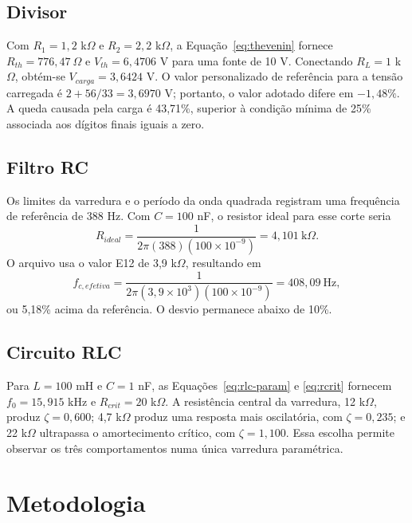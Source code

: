 \documentclass[10pt,journal,onecolumn,a4paper]{IEEEtran}
\begin{document}
\subsection{Divisor}

Com $R_1=1{,}2$ k$\Omega$ e $R_2=2{,}2$ k$\Omega$, a Equação~\eqref{eq:thevenin} fornece
$R_{th}=776{,}47\ \Omega$ e $V_{th}=6{,}4706$ V para uma fonte de 10 V. Conectando
$R_L=1$ k$\Omega$, obtém-se $V_{carga}=3{,}6424$ V. O valor personalizado de referência para a
tensão carregada é $2+56/33=3{,}6970$ V; portanto, o valor adotado difere em $-1{,}48\%$. A queda
causada pela carga é 43,71\%, superior à condição mínima de 25\% associada aos dígitos finais
iguais a zero.

\subsection{Filtro RC}

Os limites da varredura e o período da onda quadrada registram uma frequência de referência de
388 Hz. Com $C=100$ nF, o resistor ideal para esse corte seria
\begin{equation}
  R_{ideal}=\frac{1}{2\pi(388)(100\times10^{-9})}=4{,}101\ \text{k}\Omega.
\end{equation}
O arquivo usa o valor E12 de 3,9 k$\Omega$, resultando em
\begin{equation}
  f_{c,efetiva}=\frac{1}{2\pi(3{,}9\times10^3)(100\times10^{-9})}
               =408{,}09\ \text{Hz},
\end{equation}
ou 5,18\% acima da referência. O desvio permanece abaixo de 10\%.

\subsection{Circuito RLC}

Para $L=100$ mH e $C=1$ nF, as Equações~\eqref{eq:rlc-param} e \eqref{eq:rcrit} fornecem
$f_0=15{,}915$ kHz e $R_{crit}=20$ k$\Omega$. A resistência central da varredura, 12 k$\Omega$,
produz $\zeta=0{,}600$; 4,7 k$\Omega$ produz uma resposta mais oscilatória, com
$\zeta=0{,}235$; e 22 k$\Omega$ ultrapassa o amortecimento crítico, com $\zeta=1{,}100$.
Essa escolha permite observar os três comportamentos numa única varredura paramétrica.

\section{Metodologia}
\end{document}
